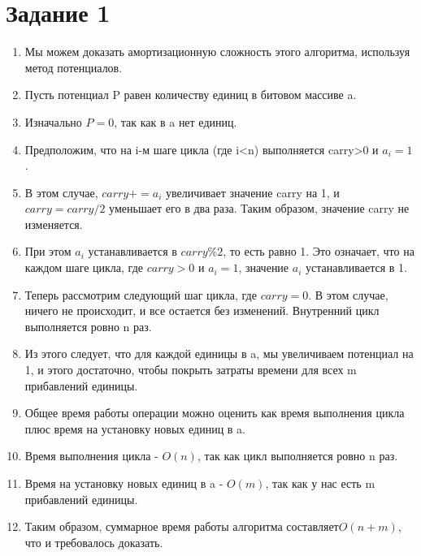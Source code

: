 
\section*{Задание 1}

\begin{enumerate}

	\item Мы можем доказать амортизационную сложность этого алгоритма, используя метод потенциалов.

	\item Пусть потенциал P равен количеству единиц в битовом массиве a. 
	
	\item Изначально $P=0$, так как в a нет единиц.
	
	\item Предположим, что на i-м шаге цикла (где i<n) выполняется carry>0 и $a_i=1$. 
	
	\item В этом случае, $carry += a_i$ увеличивает значение carry на 1, и $carry = carry / 2$ уменьшает его в два раза. Таким образом, значение carry не изменяется.
	
	\item При этом $a_i$ устанавливается в $carry \% 2$, то есть равно 1. Это означает, что на каждом шаге цикла, где $carry>0$ и $a_i=1$, значение $a_i$ устанавливается в 1.

	\item Теперь рассмотрим следующий шаг цикла, где $carry=0$. В этом случае, ничего не происходит, и все остается без изменений. Внутренний цикл выполняется ровно n раз.
	
	\item Из этого следует, что для каждой единицы в a, мы увеличиваем потенциал на 1, и этого достаточно, чтобы покрыть затраты времени для всех m прибавлений единицы.
	
	\item Общее время работы операции можно оценить как время выполнения цикла плюс время на установку новых единиц в a.
	
	\item Время выполнения цикла - $O(n)$, так как цикл выполняется ровно n раз.
	
	\item Время на установку новых единиц в a - $O(m)$, так как у нас есть m прибавлений единицы.
	
	\item Таким образом, суммарное время работы алгоритма составляет$ O(n + m)$, что и требовалось доказать.
	
\end{enumerate}
